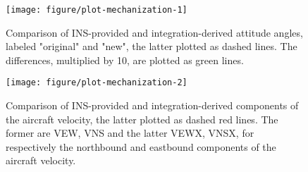 \documentclass[12pt,twoside,english,12pt,twoside,english]{article}\usepackage[]{graphicx}\usepackage[]{color}
\makeatletter
\def\maxwidth{ %
  \ifdim\Gin@nat@width>\linewidth
    \linewidth
  \else
    \Gin@nat@width
  \fi
}
\newenvironment{knitrout}{}{} %
\makeatother
\begin{document}
\begin{knitrout}
\color{fgcolor}\begin{figure}

{\centering \texttt{[image: figure/plot-mechanization-1]} 

}

\caption[Comparison of INS-provided and integration-derived attitude angles.]{Comparison of INS-provided and integration-derived attitude angles, labeled "original" and "new", the latter plotted as dashed lines. The differences, multiplied by 10, are plotted as green lines.}\label{fig:plot-mechanization1}
\end{figure}

\begin{figure}

{\centering \texttt{[image: figure/plot-mechanization-2]} 

}

\caption[Comparison of INS-provided and integration-derived components of the aircraft velocity.]{Comparison of INS-provided and integration-derived components of the aircraft velocity, the latter plotted as dashed red lines. The former are {VEW, VNS} and the latter {VEWX, VNSX}, for respectively the northbound and eastbound components of the aircraft velocity.}\label{fig:plot-mechanization2}
\end{figure}


\end{knitrout}
\end{document}
